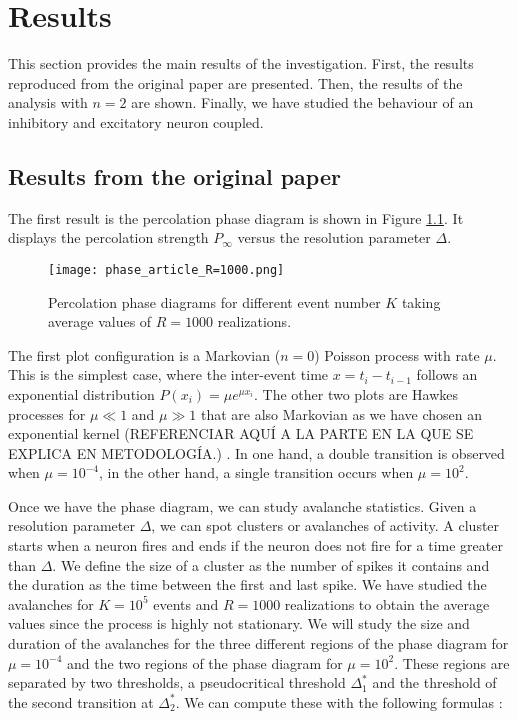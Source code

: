 \chapter{Results}

This section provides the main results of the investigation. First, the results reproduced from the original paper \cite{notarmuzi2021percolation} are presented. Then, the results of
the analysis with $n=2$ are shown. Finally, we have studied the behaviour of an inhibitory and excitatory neuron coupled.

\section{Results from the original paper}

The first result is the percolation phase diagram is shown in Figure \ref{f:phase_diagram_article}. It displays the percolation strength $P_{\infty}$ versus the resolution parameter $\Delta$.

\begin{figure}[H]
    \centering
    \texttt{[image: phase\_article\_R=1000.png]}
    \caption{Percolation phase diagrams for different event number $K$ taking average values of $R=1000$ realizations.}
    \label{f:phase_diagram_article}
\end{figure}

The first plot configuration is a Markovian ($n=0$) Poisson process with rate $\mu$. This is the simplest case, where the inter-event time $x=t_i-t_{i-1}$ follows an exponential 
distribution $P(x_i)=\mu e^{\mu x_i}$. The other two plots are Hawkes processes for $\mu \ll 1$ and $\mu\gg 1$ that are also Markovian as we have chosen an exponential kernel (REFERENCIAR 
AQUÍ A LA PARTE EN LA QUE SE EXPLICA EN METODOLOGÍA.)
. In one hand, a double transition is observed when 
$\mu = 10^{-4}$, in the other hand, a single transition occurs when $\mu = 10^2$. 

Once we have the phase diagram, we can study avalanche statistics. Given a resolution parameter $\Delta$, we can spot clusters or avalanches of activity.
A cluster starts when a neuron fires and ends if the neuron does not fire for a time greater than $\Delta$. We define the size of a cluster as the number of spikes it contains and the duration
as the time between the first and last spike. We have studied the avalanches for $K=10^5$ events and $R=1000$ realizations to obtain the average values since the process is highly not 
stationary. We will study the size and duration of the avalanches for the three different regions of the phase diagram for $\mu=10^{-4}$ and the two regions of the phase diagram for $\mu=10^2$.
These regions are separated by two thresholds, a pseudocritical threshold $\Delta_1^*$ and the threshold of the second transition at $\Delta_2^*$.
We can compute these with the following formulas \cite{notarmuzi2021percolation}:


